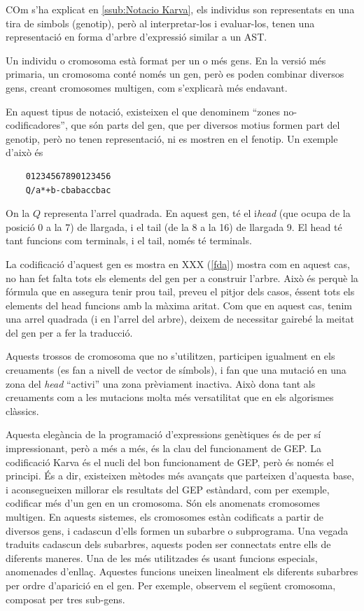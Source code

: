 \documentclass[titlepage,a4paper,12pt]{book}
\begin{document}
COm s'ha explicat en \ref{ssub:Notacio Karva}, els individus son representats en
una tira de simbols (genotip), però al interpretar-los i evaluar-los, tenen una
representació en forma d'arbre d'expressió similar a un AST.

Un individu o cromosoma està format per un o més gens.  En la versió més
primaria, un cromosoma conté només un gen, però es poden combinar diversos gens,
creant cromosomes multigen, com s'explicarà més endavant.

En aquest tipus de notació, existeixen el que denominem ``zones
no-codificadores'', que són parts del gen, que per diversos motius formen part
del genotip, però no tenen representació, ni es mostren en el fenotip.  Un
exemple d'això és


\begin{verbatim}
	01234567890123456 	 
	Q/a*+b-cbabaccbac
\end{verbatim}

On la $Q$ representa l'arrel quadrada.  En aquest gen, té el i\emph{head} (que ocupa
de la posició 0 a la 7) de llargada, i el tail (de la 8 a la 16) de llargada 9.
El head té tant funcions com terminals, i el tail, només té terminals.

La codificació d'aquest gen es mostra en XXX (\ref{fda}) mostra com en aquest cas,
no han fet falta tots els elements del gen per a construir l'arbre.  Això és
perquè la fórmula que en assegura tenir prou tail, preveu el pitjor dels casos,
éssent tots els elements del head funcions amb la màxima aritat.  Com que en
aquest cas, tenim una arrel quadrada (i en l'arrel del arbre), deixem de
necessitar gairebé la meitat del gen per a fer la traducció.

Aquests trossos de cromosoma que no s'utilitzen, participen igualment en els
creuaments (es fan a nivell de vector de símbols), i fan que una mutació en una
zona del \emph{head} ``activi'' una zona prèviament inactiva.  Això dona tant
als creuaments com a les mutacions molta més versatilitat que en els algorismes
clàssics.

Aquesta elegància de la programació d'expressions genètiques és de per
sí impressionant, però a més a més, és la clau del funcionament de GEP.
La codificació Karva és el nucli del bon funcionament de GEP, però és només el
principi.  És a dir, existeixen mètodes més avançats que parteixen d'aquesta
base, i aconsegueixen millorar els resultats del GEP estàndard, com per exemple,
codificar més d'un gen en un cromosoma. Són els anomenats cromosomes multigen.
En aquests sistemes, els cromosomes estàn codificats a partir de diversos gens,
i cadascun d'ells formen un subarbre o subprograma.  Una vegada traduits
cadascun dels subarbres, aquests poden ser connectats entre ells de diferents
maneres.  Una de les més utilitzades és usant funcions especials, anomenades
d'enllaç. Aquestes funcions uneixen linealment els diferents subarbres per ordre
d'aparició en el gen.  Per exemple, observem el següent cromosoma, composat per
tres sub-gens.
\end{document}
